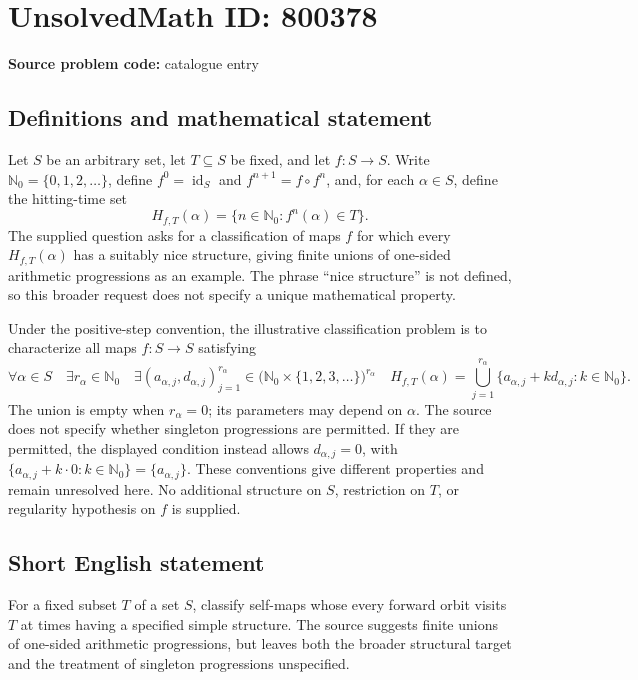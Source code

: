 \documentclass[11pt]{article}
\newcommand{\N}{\mathbb{N}}
\begin{document}
\section*{UnsolvedMath ID: 800378}
\textbf{Source problem code:} catalogue entry
\subsection{Definitions and mathematical statement}
Let \(S\) be an arbitrary set, let \(T\subseteq S\) be fixed, and let \(f:S\to S\). Write \(\N_0=\{0,1,2,\ldots\}\), define \(f^0=\operatorname{id}_S\) and \(f^{n+1}=f\circ f^n\), and, for each \(\alpha\in S\), define the hitting-time set
\[
H_{f,T}(\alpha)=\{n\in\N_0:f^n(\alpha)\in T\}.
\]
The supplied question asks for a classification of maps \(f\) for which every \(H_{f,T}(\alpha)\) has a suitably nice structure, giving finite unions of one-sided arithmetic progressions as an example. The phrase ``nice structure'' is not defined, so this broader request does not specify a unique mathematical property.

Under the positive-step convention, the illustrative classification problem is to characterize all maps \(f:S\to S\) satisfying
\[
\forall\alpha\in S\quad
\exists r_\alpha\in\N_0\quad
\exists (a_{\alpha,j},d_{\alpha,j})_{j=1}^{r_\alpha}
\in\bigl(\N_0\times\{1,2,3,\ldots\}\bigr)^{r_\alpha}
\quad
H_{f,T}(\alpha)
=\bigcup_{j=1}^{r_\alpha}
\{a_{\alpha,j}+k d_{\alpha,j}:k\in\N_0\}.
\]
The union is empty when \(r_\alpha=0\); its parameters may depend on \(\alpha\). The source does not specify whether singleton progressions are permitted. If they are permitted, the displayed condition instead allows \(d_{\alpha,j}=0\), with \(\{a_{\alpha,j}+k\cdot0:k\in\N_0\}=\{a_{\alpha,j}\}\). These conventions give different properties and remain unresolved here. No additional structure on \(S\), restriction on \(T\), or regularity hypothesis on \(f\) is supplied.
\subsection{Short English statement}
For a fixed subset \(T\) of a set \(S\), classify self-maps whose every forward orbit visits \(T\) at times having a specified simple structure. The source suggests finite unions of one-sided arithmetic progressions, but leaves both the broader structural target and the treatment of singleton progressions unspecified.
\end{document}
